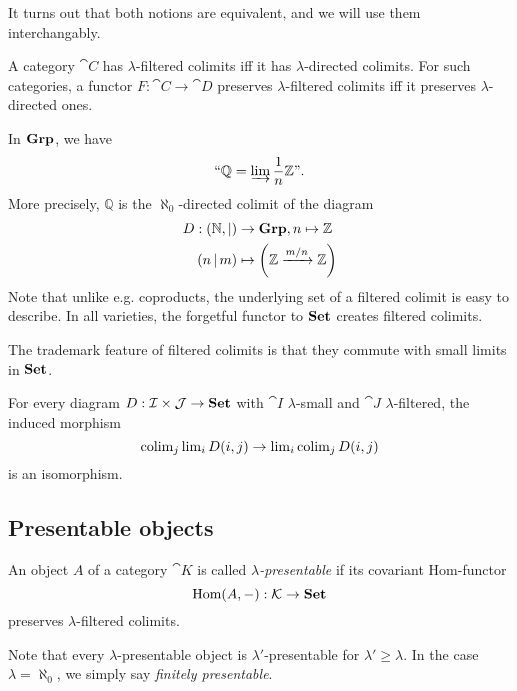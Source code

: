 It turns out that both notions are equivalent, and we will use them interchangably.

\begin{Proposition}A category $\cat C$ has $\lambda$-filtered colimits iff it has $\lambda$-directed colimits. For such categories, a functor $F : \cat C \to \cat D$ preserves $\lambda$-filtered colimits iff it preserves $\lambda$-directed ones.
\end{Proposition}

\begin{Example}\label{ex:Q}
In $\mathbf{Grp}$, we have 
\[ \text{``}\mathbb Q = \varinjlim \frac 1 n \mathbb Z\text{''}. \]
More precisely, $\mathbb Q$ is the $\aleph_0$-directed colimit of the diagram
\begin{align*}
 D : (\mathbb N, |) &\to \mathbf{Grp}, n \mapsto \mathbb Z \\
 (n\, | \,m) &\mapsto \left(\mathbb Z \xrightarrow{m/n} \mathbb Z\right)
\end{align*}
Note that unlike e.g. coproducts, the underlying set of a filtered colimit is easy to describe. In all varieties, the forgetful functor to $\mathbf{Set}$ creates filtered colimits.
\end{Example}

The trademark feature of filtered colimits is that they commute with small limits in $\mathbf{Set}$.

\begin{Proposition}\label{prop:smallvsfiltered}
For every diagram $D : \mathcal{I} \times \mathcal{J} \to \mathbf{Set}$ with $\cat I$ $\lambda$-small and $\cat J$ $\lambda$-filtered, the induced morphism
\[ \operatorname{colim}_j \operatorname{lim}_i D(i,j) \to \operatorname{lim}_i \operatorname{colim}_j D(i,j) \]
is an isomorphism.
\end{Proposition}

\subsection{Presentable objects}
\begin{Definition}
An object $A$ of a category $\cat K$ is called \emph{$\lambda$-presentable} if its covariant Hom-functor 
\[ \textrm{Hom}(A,-) : \mathcal{K} \to \mathbf{Set} \]
preserves $\lambda$-filtered colimits.
\end{Definition}

Note that every $\lambda$-presentable object is $\lambda'$-presentable for $\lambda' \geq \lambda$. In the case $\lambda=\aleph_0$, we simply say \emph{finitely presentable}. \\

